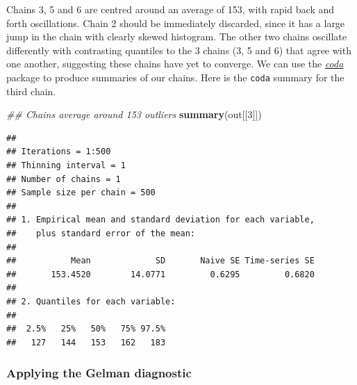 \documentclass[
]{article}
\newenvironment{Shaded}{\begin{snugshade}}{\end{snugshade}}
\newcommand{\CommentTok}[1]{\textcolor[rgb]{0.56,0.35,0.01}{\textit{#1}}}
\newcommand{\DecValTok}[1]{\textcolor[rgb]{0.00,0.00,0.81}{#1}}
\newcommand{\KeywordTok}[1]{\textcolor[rgb]{0.13,0.29,0.53}{\textbf{#1}}}
\newcommand{\NormalTok}[1]{#1}
\begin{document}
Chains 3, 5 and 6 are centred around an average of 153, with rapid back
and forth oscillations. Chain 2 should be immediately discarded, since
it has a large jump in the chain with clearly skewed histogram. The
other two chains oscillate differently with contrasting quantiles to the
3 chains (3, 5 and 6) that agree with one another, suggesting these
chains have yet to converge. We can use the
\emph{\href{https://CRAN.R-project.org/package=coda}{coda}} package to
produce summaries of our chains. Here is the \texttt{coda} summary for
the third chain.

\begin{Shaded}
\begin{Highlighting}[]
\CommentTok{## Chains average around 153 outliers}
\KeywordTok{summary}\NormalTok{(out[[}\DecValTok{3}\NormalTok{]])}
\end{Highlighting}
\end{Shaded}

\begin{verbatim}
## 
## Iterations = 1:500
## Thinning interval = 1 
## Number of chains = 1 
## Sample size per chain = 500 
## 
## 1. Empirical mean and standard deviation for each variable,
##    plus standard error of the mean:
## 
##           Mean             SD       Naive SE Time-series SE 
##       153.4520        14.0771         0.6295         0.6820 
## 
## 2. Quantiles for each variable:
## 
##  2.5%   25%   50%   75% 97.5% 
##   127   144   153   162   183
\end{verbatim}

\hypertarget{applying-the-gelman-diagnostic}{%
\subsubsection{Applying the Gelman
diagnostic}\label{applying-the-gelman-diagnostic}}
\end{document}
